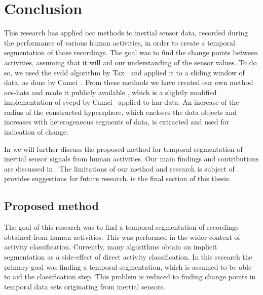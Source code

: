 
\chapter{Conclusion}

\label{Chapter7} %


This research has applied \gls{occ} methods to inertial sensor data, recorded during the performance of various human activities, in order to create a temporal segmentation of those recordings.
The goal was to find the change points between activities, assuming that it will aid our understanding of the sensor values.
To do so, we used the \gls{svdd} algorithm by Tax~\cite{tax1999support} and applied it to a sliding window of data, as done by Camci~\cite{camci2010change}.
From these methods we have created our own method \gls{ocs-hats} and made it publicly available \cite{vlasveld2014hats}, which is a slightly modified implementation of \gls{svcpd} by Camci~\cite{camci2010change} applied to \gls{har} data.
An increase of the radius of the constructed hypersphere, which encloses the data objects and increases with heterogeneous segments of data, is extracted and used for indication of change.

In  we will further discuss the proposed method for temporal segmentation of inertial sensor signals from human activities.
Our main findings and contributions are discussed in .
The limitations of our method and research is subject of .
 provides suggestions for future research.
 is the final section of this thesis.

\section{Proposed method}\label{sec:proposed_method}
The goal of this research was to find a temporal segmentation of recordings obtained from human activities.
This was performed in the wider context of activity classification.
Currently, many algorithms obtain an implicit segmentation as a side-effect of direct activity classification.
In this research the primary goal was finding a temporal segmentation, which is assumed to be able to aid the classification step.
This problem is reduced to finding change points in temporal data sets originating from inertial sensors.

